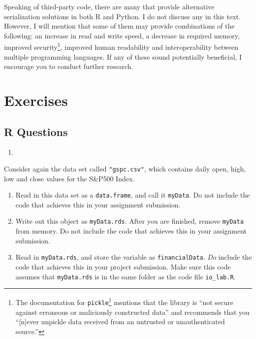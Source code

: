 \documentclass[12pt,krantz2]{krantz}
\providecommand{\tightlist}{%
  \setlength{\itemsep}{0pt}\setlength{\parskip}{0pt}}
\renewcommand{\href}[2]{#2\footnote{\url{#1}}}
\begin{document}
Speaking of third-party code, there are many that provide alternative serialization solutions in both R and Python. I do not discuss any in this text. However, I will mention that some of them may provide combinations of the following: an increase in read and write speed, a decrease in required memory, improved security\footnote{The \href{https://docs.python.org/2/library/pickle.html}{documentation for \texttt{pickle}} mentions that the library is ``not secure against erroneous or maliciously constructed data'' and recommends that you ``{[}n{]}ever unpickle data received from an untrusted or unauthenticated source.''}, improved human readability and interoperability between multiple programming languages. If any of these sound potentially beneficial, I encourage you to conduct further research.

\hypertarget{exercises-7}{%
\section{Exercises}\label{exercises-7}}

\hypertarget{r-questions-7}{%
\subsection{R Questions}\label{r-questions-7}}

\begin{enumerate}
\def\labelenumi{\arabic{enumi}.}
\item
\end{enumerate}

Consider again the data set called \texttt{"gspc.csv"}, which contains daily open, high, low and close values for the S\&P500 Index.

\begin{enumerate}
\def\labelenumi{\alph{enumi})}
\tightlist
\item
  Read in this data set as a \texttt{data.frame}, and call it \texttt{myData}. Do not include the code that achieves this in your assignment submission.
\item
  Write out this object as \texttt{myData.rds}. After you are finished, remove \texttt{myData} from memory. Do not include the code that achieves this in your assignment submission.
\item
  Read in \texttt{myData.rds}, and store the variable as \texttt{financialData}. \emph{Do} include the code that achieves this in your project submission. Make sure this code assumes that \texttt{myData.rds} is in the same folder as the code file \texttt{io\_lab.R}.
\end{enumerate}
\end{document}
